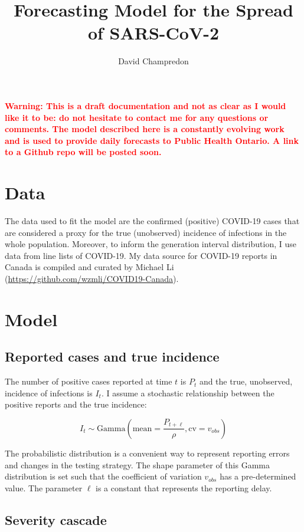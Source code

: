 \documentclass[12pt]{article}
\title{Forecasting Model for the Spread of SARS-CoV-2}
\author{\sc David Champredon}
\affil{Department of Pathology and Laboratory Medicine \\Western University (London, Ontario)\\ \texttt{\small{david.champredon@gmail.com}}}
\newcommand{\gam}{\mathrm{Gamma}}
\newcommand{\warning}[1]{\textbf{\textcolor{red}{#1}}\xspace}
\begin{document}
\maketitle


\warning{ Warning: This is a draft documentation and not as clear as I would like it to be: do not hesitate to contact me for any questions or comments. The model described here is a constantly evolving work and is used to provide daily forecasts to Public Health Ontario. A link to a Github repo will be posted soon.}

\section{Data}

The data used to fit the model are the confirmed (positive) COVID-19 cases that are considered a proxy for the true (unobserved) incidence of infections in the whole population. 
Moreover, to inform the generation interval distribution, I use data from line lists of COVID-19.
My data source for COVID-19 reports in Canada is compiled and curated by Michael Li (\href{https://github.com/wzmli/COVID19-Canada}{https://github.com/wzmli/COVID19-Canada}).


\section{Model}

\subsection{Reported cases and true incidence}
The number of positive cases reported at time $t$ is $P_t$ and the true, unobserved, incidence of infections is $I_t$. 
I assume a stochastic relationship between the positive reports and the true incidence:

\begin{equation}
I_t \sim \gam\left( \mathrm{mean}=\frac{P_{t+\ell}}{\rho} , \mathrm{cv}=v_{obs} \right)
\end{equation}

The probabilistic distribution is a convenient way to represent reporting errors and changes in the testing strategy. The shape parameter of this Gamma distribution is set such that the coefficient of variation $v_{obs}$ has a pre-determined value.
The parameter $\ell$ is a constant that represents the reporting delay. 

\subsection{Severity cascade}
\end{document}
